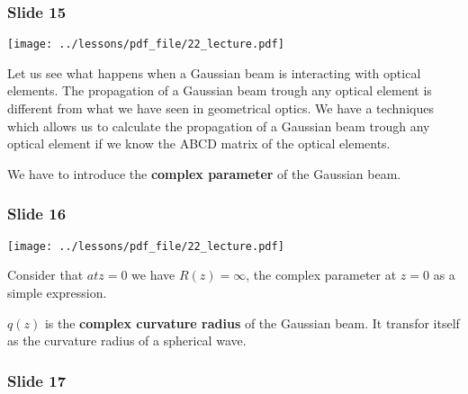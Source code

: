 \documentclass[../main/main.tex]{subfiles}
\begin{document}
\subsubsection*{Slide 15}

\begin{minipage}[]{0.5\linewidth}
\centering
\texttt{[image: ../lessons/pdf\_file/22\_lecture.pdf]}
\end{minipage}
\hspace{0.3cm}\vspace{0.3cm}
\begin{minipage}[c]{0.47\linewidth}

Let us see what happens when a Gaussian beam is interacting with optical elements. The propagation of a Gaussian beam trough any optical element is different from what we have seen in geometrical optics. We have a techniques which allows us to calculate the propagation of a Gaussian beam trough any optical element if we know the ABCD matrix of the optical elements.

We have to introduce the \textbf{complex parameter} of the Gaussian beam.

\end{minipage}

\subsubsection*{Slide 16}

\begin{minipage}[]{0.5\linewidth}
\centering
\texttt{[image: ../lessons/pdf\_file/22\_lecture.pdf]}
\end{minipage}
\hspace{0.3cm}\vspace{0.3cm}
\begin{minipage}[c]{0.47\linewidth}

Consider that \( at z=0 \) we have \( R(z) = \infty  \), the complex parameter at \( z=0 \) as a simple expression.

\( q(z) \) is the \textbf{complex curvature radius} of the Gaussian beam. It transfor itself as the curvature radius of a spherical wave.

\end{minipage}

\subsubsection*{Slide 17}
\end{document}
